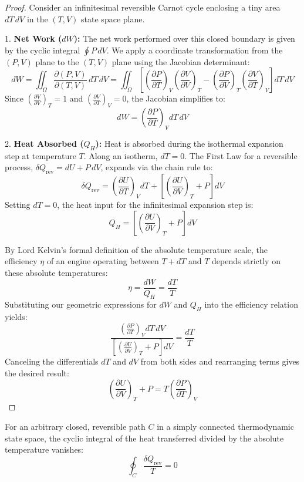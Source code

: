 \begin{proof}
Consider an infinitesimal reversible Carnot cycle enclosing a tiny area $dT\,dV$ in the $(T,V)$ state space plane. 

1. \textbf{Net Work ($dW$):} The net work performed over this closed boundary is given by the cyclic integral $\oint P\,dV$. We apply a coordinate transformation from the $(P,V)$ plane to the $(T,V)$ plane using the Jacobian determinant:
\[
dW = \iint_\Omega \frac{\partial(P,V)}{\partial(T,V)}\,dT\,dV = \iint_\Omega \left[ \left(\frac{\partial P}{\partial T}\right)_V \left(\frac{\partial V}{\partial V}\right)_T - \left(\frac{\partial P}{\partial V}\right)_T \left(\frac{\partial V}{\partial T}\right)_V \right] dT\,dV
\]
Since $\left(\frac{\partial V}{\partial V}\right)_T = 1$ and $\left(\frac{\partial V}{\partial T}\right)_V = 0$, the Jacobian simplifies to:
\[
dW = \left(\frac{\partial P}{\partial T}\right)_V dT\,dV
\]

2. \textbf{Heat Absorbed ($Q_H$):} Heat is absorbed during the isothermal expansion step at temperature $T$. Along an isotherm, $dT = 0$. The First Law for a reversible process, $\delta Q_{\text{rev}} = dU + P\,dV$, expands via the chain rule to:
\[
\delta Q_{\text{rev}} = \left(\frac{\partial U}{\partial T}\right)_V dT + \left[\left(\frac{\partial U}{\partial V}\right)_T + P\right] dV
\]
Setting $dT = 0$, the heat input for the infinitesimal expansion step is:
\[
Q_H = \left[\left(\frac{\partial U}{\partial V}\right)_T + P\right] dV
\]

By Lord Kelvin's formal definition of the absolute temperature scale, the efficiency $\eta$ of an engine operating between $T+dT$ and $T$ depends strictly on these absolute temperatures:
\[
\eta = \frac{dW}{Q_H} = \frac{dT}{T}
\]
Substituting our geometric expressions for $dW$ and $Q_H$ into the efficiency relation yields:
\[
\frac{\left(\frac{\partial P}{\partial T}\right)_V dT\,dV}{\left[\left(\frac{\partial U}{\partial V}\right)_T + P\right] dV} = \frac{dT}{T}
\]
Canceling the differentials $dT$ and $dV$ from both sides and rearranging terms gives the desired result:
\[
\left(\frac{\partial U}{\partial V}\right)_T + P = T\left(\frac{\partial P}{\partial T}\right)_V
\]
\end{proof}

\begin{theorem}
For an arbitrary closed, reversible path $C$ in a simply connected thermodynamic state space, the cyclic integral of the heat transferred divided by the absolute temperature vanishes:
\[
\oint_C \frac{\delta Q_{\text{rev}}}{T} = 0
\]
\end{theorem}

